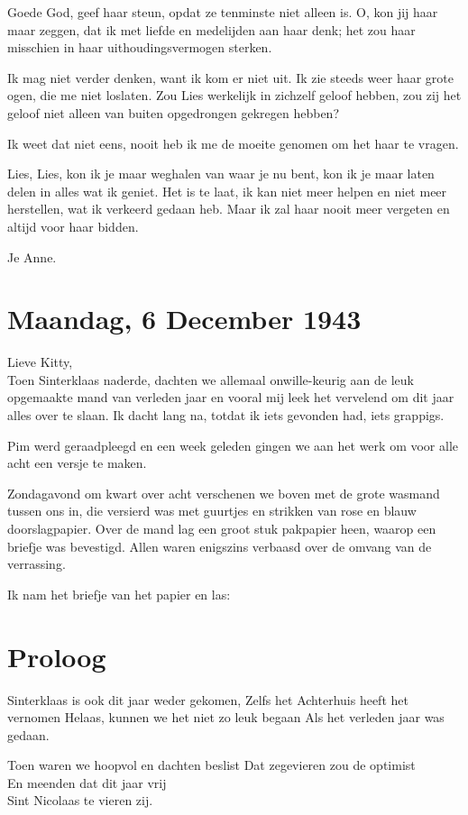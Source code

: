 \documentclass{book}
\begin{document}
Goede God, geef haar steun, opdat ze tenminste niet alleen is. O, kon
jij haar maar zeggen, dat ik met liefde en medelijden aan haar denk; het
zou haar misschien in haar uithoudingsvermogen sterken.

Ik mag niet verder denken, want ik kom er niet uit. Ik zie steeds weer
haar grote ogen, die me niet loslaten. Zou Lies werkelijk in zichzelf
geloof hebben, zou zij het geloof niet alleen van buiten opgedrongen
gekregen hebben?

Ik weet dat niet eens, nooit heb ik me de moeite genomen om het haar te
vragen.

Lies, Lies, kon ik je maar weghalen van waar je nu bent, kon ik je maar
laten delen in alles wat ik geniet. Het is te laat, ik kan niet meer
helpen en niet meer herstellen, wat ik verkeerd gedaan heb. Maar ik zal
haar nooit meer vergeten en altijd voor haar bidden.

Je Anne.

\chapter{Maandag, 6 December 1943}

Lieve Kitty,\\Toen Sinterklaas naderde, dachten we allemaal
onwille-keurig aan de leuk opgemaakte mand van verleden jaar en vooral
mij leek het vervelend om dit jaar alles over te slaan. Ik dacht lang
na, totdat ik iets gevonden had, iets grappigs.

Pim werd geraadpleegd en een week geleden gingen we aan het werk om voor
alle acht een versje te maken.

Zondagavond om kwart over acht verschenen we boven met de grote wasmand
tussen ons in, die versierd was met guurtjes en strikken van rose en
blauw doorslagpapier. Over de mand lag een groot stuk pakpapier heen,
waarop een briefje was bevestigd. Allen waren enigszins verbaasd over de
omvang van de verrassing.

Ik nam het briefje van het papier en las:

\chapter{Proloog}

Sinterklaas is ook dit jaar weder gekomen, Zelfs het Achterhuis heeft
het vernomen Helaas, kunnen we het niet zo leuk begaan Als het verleden
jaar was gedaan.

Toen waren we hoopvol en dachten beslist Dat zegevieren zou de
optimist\\En meenden dat dit jaar vrij\\Sint Nicolaas te vieren zij.
\end{document}
